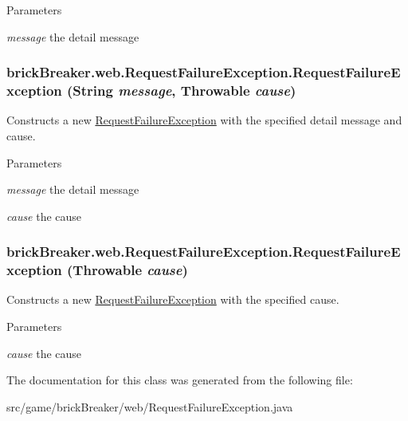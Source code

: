 \begin{DoxyParams}{Parameters}
\item[{\em message}]the detail message \end{DoxyParams}
\hypertarget{classbrick_breaker_1_1web_1_1_request_failure_exception_ab61c4dda3a1de78730729cd4b42d6863}{
\subsubsection[{RequestFailureException}]{\setlength{\rightskip}{0pt plus 5cm}brickBreaker.web.RequestFailureException.RequestFailureException (String {\em message}, \/  Throwable {\em cause})}}
\label{classbrick_breaker_1_1web_1_1_request_failure_exception_ab61c4dda3a1de78730729cd4b42d6863}
Constructs a new {\ttfamily \hyperlink{classbrick_breaker_1_1web_1_1_request_failure_exception}{RequestFailureException}} with the specified detail message and cause.


\begin{DoxyParams}{Parameters}
\item[{\em message}]the detail message \item[{\em cause}]the cause \end{DoxyParams}
\hypertarget{classbrick_breaker_1_1web_1_1_request_failure_exception_ab1b4d46e0cfbbe6a3402d6f1d733bd82}{
\subsubsection[{RequestFailureException}]{\setlength{\rightskip}{0pt plus 5cm}brickBreaker.web.RequestFailureException.RequestFailureException (Throwable {\em cause})}}
\label{classbrick_breaker_1_1web_1_1_request_failure_exception_ab1b4d46e0cfbbe6a3402d6f1d733bd82}
Constructs a new {\ttfamily \hyperlink{classbrick_breaker_1_1web_1_1_request_failure_exception}{RequestFailureException}} with the specified cause.


\begin{DoxyParams}{Parameters}
\item[{\em cause}]the cause \end{DoxyParams}


The documentation for this class was generated from the following file:\begin{DoxyCompactItemize}
\item 
src/game/brickBreaker/web/RequestFailureException.java\end{DoxyCompactItemize}
